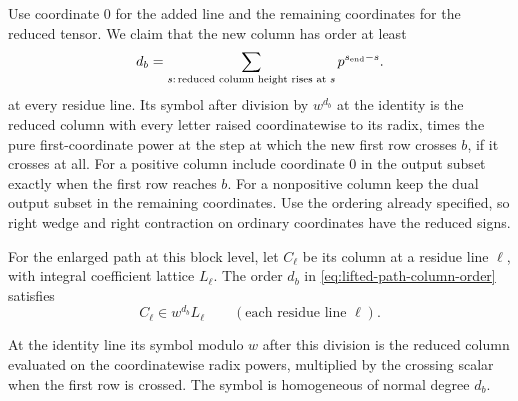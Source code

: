 Use coordinate 0 for the added line and the remaining coordinates
for the reduced tensor. We claim that the new column has order
at least
\begin{equation}\label{eq:lifted-path-column-order}
 d_b=\sum_{s:\,\text{reduced column height rises at }s}
                         p^{s_{\rm end}-s}.
\end{equation}
at every residue line. Its symbol after division by \(w^{d_b}\)
at the identity is the reduced column with every letter raised
coordinatewise to its radix, times the pure first-coordinate
power at the step at which the new first row crosses \(b\),
if it crosses at all. For a positive column include coordinate
0 in the output subset exactly when the first row reaches \(b\).
For a nonpositive column keep the dual output subset in the
remaining coordinates. Use the ordering already specified, so
right wedge and right contraction on ordinary coordinates have
the reduced signs.

\begin{lemma}
\label{lem:column-graded-lift}
For the enlarged path at this block level, let \(C_\ell\) be its column at a residue line \(\ell\), with integral coefficient lattice \(L_\ell\). The order \(d_b\) in \eqref{eq:lifted-path-column-order} satisfies
\[
 C_\ell\in w^{d_b}L_\ell\qquad(\text{each residue line }\ell).
\]

At the identity line its symbol modulo \(w\) after this division is
the reduced column evaluated on the coordinatewise radix powers,
multiplied by the crossing scalar when the first row is crossed. The
symbol is homogeneous of normal degree \(d_b\).
\end{lemma}

